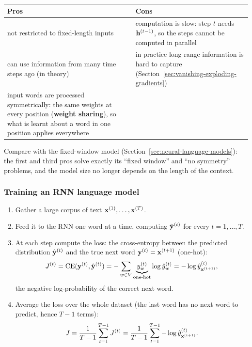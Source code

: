 \begin{center}
\small
\begin{tabularx}{\linewidth}{@{}X X@{}}
\toprule
\textbf{Pros} & \textbf{Cons} \\
\midrule
not restricted to fixed-length inputs &
  computation is slow: step $t$ needs $\mathbf{h}^{(t-1)}$, so the steps cannot be computed
  in parallel \\
can use information from many time steps ago (in theory) &
  in practice long-range information is hard to capture
  (Section~\ref{sec:vanishing-exploding-gradients}) \\
input words are processed symmetrically: the same weights at every position
(\textbf{weight sharing}), so what is learnt about a word in one position applies
everywhere & \\
\bottomrule
\end{tabularx}
\end{center}
Compare with the fixed-window model (Section~\ref{sec:neural-language-models}): the
first and third pros solve exactly its ``fixed window'' and ``no symmetry'' problems,
and the model size no longer depends on the length of the context.

\subsubsection{Training an RNN language model}

\begin{enumerate}
  \item Gather a large corpus of text $\mathbf{x}^{(1)}, \ldots, \mathbf{x}^{(T)}$.
  \item Feed it to the RNN one word at a time, computing $\hat{\mathbf{y}}^{(t)}$ for every
        $t = 1, \ldots, T$.
  \item At each step compute the loss: the cross-entropy between the predicted
        distribution $\hat{\mathbf{y}}^{(t)}$ and the true next word
        $\mathbf{y}^{(t)} = \mathbf{x}^{(t+1)}$ (one-hot):
        \[
          J^{(t)} = \mathrm{CE}(\mathbf{y}^{(t)}, \hat{\mathbf{y}}^{(t)})
          = -\sum_{w \in V} \underbrace{y^{(t)}_w}_{\text{one-hot}} \log \hat y^{(t)}_w
          = -\log \hat y^{(t)}_{\mathbf{x}^{(t+1)}} ,
        \]
        the negative log-probability of the correct next word.
  \item Average the loss over the whole dataset (the last word has no next word to
        predict, hence $T-1$ terms):
        \[
          J = \frac{1}{T-1} \sum_{t=1}^{T-1} J^{(t)}
            = \frac{1}{T-1} \sum_{t=1}^{T-1} -\log \hat y^{(t)}_{\mathbf{x}^{(t+1)}} .
        \]
\end{enumerate}


